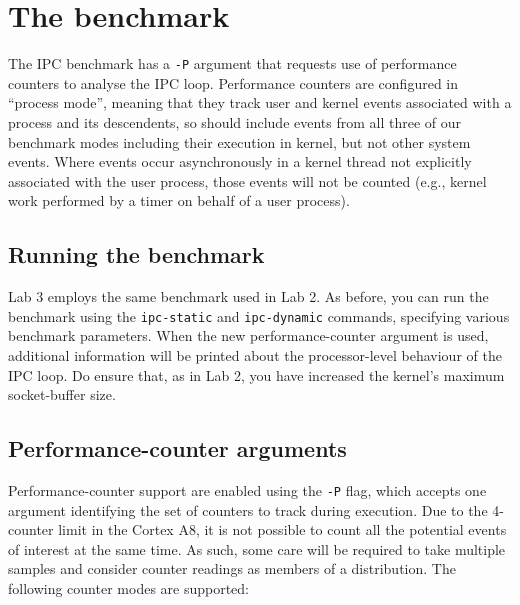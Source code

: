 \documentclass[a4paper,10pt]{article}
\begin{document}
\section*{The benchmark}

The IPC benchmark has a \texttt{-P} argument that requests use of performance
counters to analyse the IPC loop.
Performance counters are configured in ``process mode'', meaning that they
track user and kernel events associated with a process and its descendents, so
should include events from all three of our benchmark modes including their
execution in kernel, but not other system events.
Where events occur asynchronously in a kernel thread not explicitly associated
with the user process, those events will not be counted (e.g., kernel work
performed by a timer on behalf of a user process).

\subsection*{Running the benchmark}

Lab 3 employs the same benchmark used in Lab 2.
As before, you can run the benchmark using the \texttt{ipc-static} and
\texttt{ipc-dynamic} commands, specifying various benchmark parameters.
When the new performance-counter argument is used, additional information will
be printed about the processor-level behaviour of the IPC loop.
Do ensure that, as in Lab 2, you have increased the kernel's maximum
socket-buffer size.

\subsection*{Performance-counter arguments}

Performance-counter support are enabled using the \texttt{-P} flag, which
accepts one argument identifying the set of counters to track during
execution.
Due to the 4-counter limit in the Cortex A8, it is not possible to count all
the potential events of interest at the same time.
As such, some care will be required to take multiple samples and consider
counter readings as members of a distribution.
The following counter modes are supported:
\end{document}
